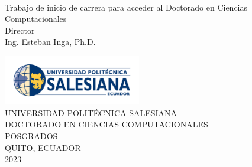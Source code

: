 \newpage
 \thispagestyle{empty}%
     \begin{center}
        \large\uppercase\expandafter{\textbf{
            \patTitulo
        }}
     \end{center}

     \begin{center}
         \vskip2cm
         \large\expandafter{\textbf{
            \patNombre
         }}  \\
         \vfill
         \normalsize 
            Trabajo de inicio de carrera para acceder al Doctorado en Ciencias Computacionales\\
         \vskip1cm
         \normalsize Director\\
         \vskip0.3cm
         \normalsize Ing. Esteban Inga, Ph.D. \\
     \end{center}
     \vfill
    \begin{center}
        \includegraphics[width=6cm]{logoups.png}\\
        \uppercase\expandafter{Universidad Politécnica Salesiana} \\
        \uppercase\expandafter{DOCTORADO EN CIENCIAS COMPUTACIONALES} \\
        \uppercase\expandafter{Posgrados} \\
        \uppercase\expandafter{Quito, Ecuador} \\
        \uppercase\expandafter{2023}
    \end{center}